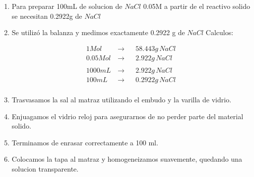 \documentclass[12pt,a4paper]{report}
\begin{document}
\begin{enumerate}[label=\alph*]
  \item Para preparar 100mL de solucion de $NaCl$ 0.05M a partir de el reactivo solido se necesitan 0.2922g de $NaCl$

  \item Se utilizó la balanza y medimos exactamente 0.2922 g de $NaCl$
  Calculos:

      $$
\begin{aligned}
   1 Mol  \, &\rightarrow&& 58.443g \,NaCl\\[6pt]
   0.05 Mol  \, &\rightarrow&& 2.922g \,NaCl\\[6pt]
    \\
   1000mL \,  &\rightarrow&& 2.922g \,NaCl\\[6pt]
    100mL\,  &\rightarrow&& 0.2922g \,NaCl\\[6pt]
\end{aligned}
$$

  \item Trasvasamos la sal al matraz utilizando el embudo y la varilla de vidrio.

  \item Enjuagamos el vidrio reloj para asegurarnos de no perder parte del material solido.

  \item Terminamos de enrasar correctamente a 100 ml.

  \item Colocamos la tapa al matraz y homogeneizamos suavemente, quedando una solucion transparente.
\end{enumerate}
\end{document}
